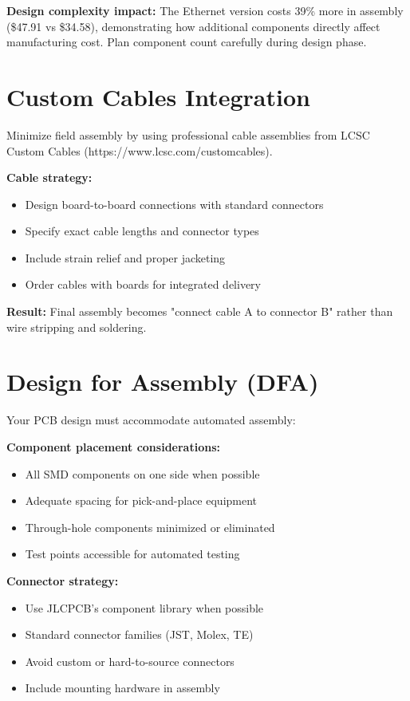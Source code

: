 \textbf{Design complexity impact:}
The Ethernet version costs 39\% more in assembly (\$47.91 vs \$34.58), demonstrating how additional components directly affect manufacturing cost. Plan component count carefully during design phase.

\section{Custom Cables Integration}

Minimize field assembly by using professional cable assemblies from LCSC Custom Cables (https://www.lcsc.com/customcables).

\textbf{Cable strategy:}
\begin{itemize}
\item Design board-to-board connections with standard connectors
\item Specify exact cable lengths and connector types
\item Include strain relief and proper jacketing
\item Order cables with boards for integrated delivery
\end{itemize}

\textbf{Result:} Final assembly becomes "connect cable A to connector B" rather than wire stripping and soldering.

\section{Design for Assembly (DFA)}

Your PCB design must accommodate automated assembly:

\textbf{Component placement considerations:}
\begin{itemize}
\item All SMD components on one side when possible
\item Adequate spacing for pick-and-place equipment
\item Through-hole components minimized or eliminated
\item Test points accessible for automated testing
\end{itemize}

\textbf{Connector strategy:}
\begin{itemize}
\item Use JLCPCB's component library when possible
\item Standard connector families (JST, Molex, TE)
\item Avoid custom or hard-to-source connectors
\item Include mounting hardware in assembly
\end{itemize}

